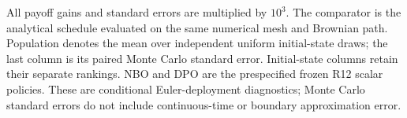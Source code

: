 \par\medskip\noindent\footnotesize All payoff gains and standard errors are multiplied by $10^3$. The comparator is the analytical schedule evaluated on the same numerical mesh and Brownian path. Population denotes the mean over independent uniform initial-state draws; the last column is its paired Monte Carlo standard error. Initial-state columns retain their separate rankings. NBO and DPO are the prespecified frozen R12 scalar policies. These are conditional Euler-deployment diagnostics; Monte Carlo standard errors do not include continuous-time or boundary approximation error.
\endgroup
